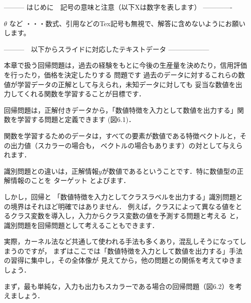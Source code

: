 --------- はじめに　記号の意味と注意（以下Xは数字を表します） -------------

$\theta$ など       ・・・数式、引用などのTex記号も無視で、解答に含めないようにお願いします。
\cite{mitchell97}

---------　以下からスライドに対応したテキストデータ ------------------


本章で扱う回帰問題は，過去の経験をもとに今後の生産量を決めたり，信用評価を行ったり，価格を決定したりする
問題です
過去のデータに対するこれらの数値が学習データの正解として与えられ，未知データに対しても
妥当な数値を出力してくれる関数を学習することが目標です．

回帰問題は，正解付きデータから，「数値特徴を入力として数値を出力する」関数を学習する問題と定義できます
(図6.1)．



関数を学習するためのデータは，すべての要素が数値である特徴ベクトルと，その出力値（スカラーの場合も，
ベクトルの場合もあります）の対として与えられます．


識別問題との違いは，正解情報$y$が数値であるということです．特に数値型の正解情報のことを
ターゲット
とよびます．

しかし，回帰と
「数値特徴を入力としてクラスラベルを出力する」識別問題との境界はそれほど明確ではありません．
例えば，クラスによって異なる値をとるクラス変数を導入し，入力からクラス変数の値を予測する問題と考える
と，識別問題を回帰問題として考えることもできます．

実際，カーネル法など共通して使われる手法も多くあり，混乱しそうになってしまうのですが，
まずはここでは「数値特徴を入力として数値を出力する」手法の習得に集中し，その全体像が
見えてから，他の問題との関係を考えてゆきましょう．



まず，最も単純な，入力も出力もスカラーである場合の回帰問題（図6.2）を考えましょう．

